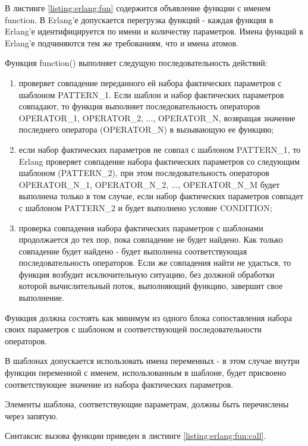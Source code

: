 В листинге \ref{listing:erlang:fun} содержится объявление функции с именем function. В Erlang'е допускается перегрузка функций - каждая функция в Erlang'е идентифицируется по имени и количеству параметров. Имена функций в Erlang'е подчиняются тем же требованиям, что и имена атомов.

Функция function() выполняет следущую последовательность действий:

\begin{enumerate}

	\item проверяет совпадение переданного ей набора фактических параметров с шаблоном PATTERN\_1. Если шаблон и набор фактических параметров совпадают, то функция выполняет последовательность операторов OPERATOR\_1, OPERATOR\_2, ..., OPERATOR\_N, возвращая значение последнего оператора (OPERATOR\_N) в вызывающую ее функцию;

	\item если набор фактических параметров не совпал с шаблоном PATTERN\_1, то Erlang проверяет совпадение набора фактических параметров со следующим шаблоном (PATTERN\_2), при этом последовательность операторов OPERATOR\_N\_1, OPERATOR\_N\_2, ..., OPERATOR\_N\_M будет выполнена только в том случае, если набор фактических параметров совпадет с шаблоном PATTERN\_2 и будет выполнено условие CONDITION;

	\item проверка совпадения набора фактических параметров с шаблонами продолжается до тех пор, пока совпадение не будет найдено. Как только совпадение будет найдено - будет выполнена соответствующая последовательность операторов. Если же совпадения найти не удасться, то функция возбудит исключительную ситуацию, без должной обработки которой вычислительный поток, выполняющий функцию, завершит свое выполнение.

\end{enumerate}

Функция должна состоять как минимум из одного блока сопоставления набора своих параметров с шаблоном и соответствующей последовательности операторов.

В шаблонах допускается использовать имена переменных - в этом случае внутри функции переменной с именем, использованным в шаблоне, будет присвоено соответствующее значение из набора фактических параметров.

Элементы шаблона, соответствующие параметрам, должны быть перечислены через запятую.

Синтаксис вызова функции приведен в листинге \ref{listing:erlang:fun:call}.

